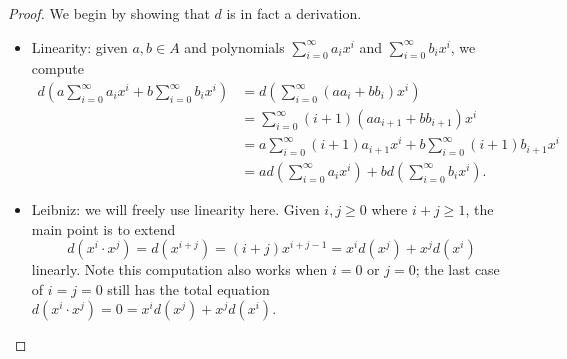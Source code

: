 \documentclass[../notes.tex]{subfiles}
\begin{document}
\begin{proof}
	We begin by showing that $d$ is in fact a derivation.
	\begin{itemize}
		\item Linearity: given $a,b\in A$ and polynomials $\sum_{i=0}^\infty a_ix^i$ and $\sum_{i=0}^\infty b_ix^i$, we compute
		\begin{align*}
			d\left(a\sum_{i=0}^\infty a_ix^i+b\sum_{i=0}^\infty b_ix^i\right) &= d\left(\sum_{i=0}^\infty (aa_i+bb_i)x^i\right) \\
			&= \sum_{i=0}^\infty(i+1)(aa_{i+1}+bb_{i+1})x^i \\
			&= a\sum_{i=0}^\infty(i+1)a_{i+1}x^i+b\sum_{i=0}^\infty(i+1)b_{i+1}x^i \\
			&= ad\left(\sum_{i=0}^\infty a_ix^i\right)+bd\left(\sum_{i=0}^\infty b_ix^i\right).
		\end{align*}
		\item Leibniz: we will freely use linearity here. Given $i,j\ge0$ where $i+j\ge1$, the main point is to extend
		\begin{equation}
			d\left(x^i\cdot x^j\right)=d\left(x^{i+j}\right)=(i+j)x^{i+j-1}=x^id\left(x^j\right)+x^jd\left(x^i\right) \label{eq:monomial-leibniz}
		\end{equation}
		linearly. Note this computation also works when $i=0$ or $j=0$; the last case of $i=j=0$ still has the total equation $d\left(x^i\cdot x^j\right)=0=x^id\left(x^j\right)+x^jd\left(x^i\right)$.


\end{itemize}
\end{proof}
\end{document}
